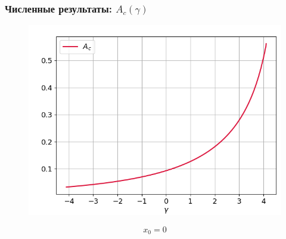 \documentclass[fullscreen=true, unicode, bookmarks=false]{beamer}
\begin{document}
\begin{frame}
\frametitle{ Численные результаты: $ A_c(\gamma) $ }

\begin{figure} 
\includegraphics[scale=0.55]{oscillating_amplitude_0.png}  
\end{figure}

$$ x_0 = 0 $$

\end{frame}
\end{document}
